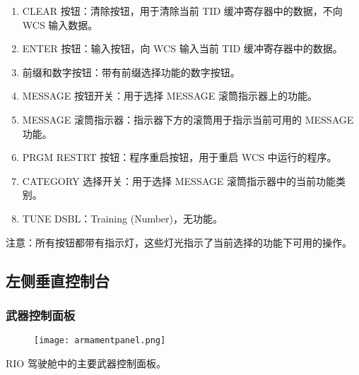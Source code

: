 \begin{enumerate}
  \item CLEAR 按钮：清除按钮，用于清除当前 TID 缓冲寄存器中的数据，不向 WCS 输入数据。
  \item ENTER 按钮：输入按钮，向 WCS 输入当前 TID 缓冲寄存器中的数据。
  \item 前缀和数字按钮：带有前缀选择功能的数字按钮。
  \item MESSAGE 按钮开关：用于选择 MESSAGE 滚筒指示器上的功能。
  \item MESSAGE 滚筒指示器：指示器下方的滚筒用于指示当前可用的 MESSAGE 功能。
  \item PRGM RESTRT 按钮：程序重启按钮，用于重启 WCS 中运行的程序。
  \item CATEGORY 选择开关：用于选择 MESSAGE 滚筒指示器中的当前功能类别。
  \item TUNE DSBL：Training (Number)，无功能。
\end{enumerate}
注意：所有按钮都带有指示灯，这些灯光指示了当前选择的功能下可用的操作。

\subsection{左侧垂直控制台}

\subsubsection{武器控制面板}
\begin{figure}[htb]
  \center
  \texttt{[image: armamentpanel.png]}
\end{figure}
RIO 驾驶舱中的主要武器控制面板。

